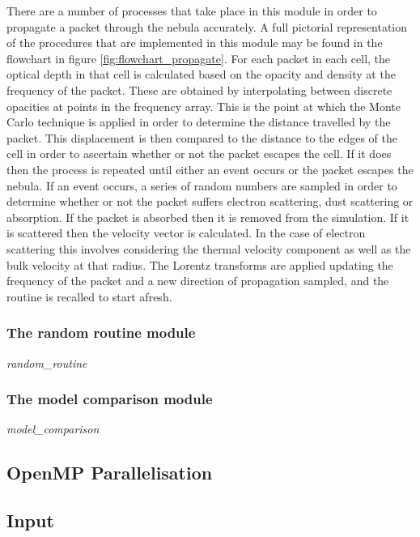 		There are a number of processes that take place in this module in order to propagate a packet through the nebula accurately.  A full pictorial representation of the procedures that are implemented in this module may be found in the flowchart in figure \ref{fig:flowchart_propagate}. For each packet in each cell, the optical depth in that cell is calculated based on the opacity and density at the frequency of the packet.  These are obtained by interpolating between discrete opacities at points in the frequency array.  This is the point at which the Monte Carlo technique is applied in order to determine the distance travelled by the packet.  This displacement is then compared to the distance to the edges of the cell in order to ascertain whether or not the packet escapes the cell.  If it does then the process is repeated until either an event occurs or the packet escapes the nebula.  If an event occurs, a series of random numbers are sampled in order to determine whether or not the packet suffers electron scattering, dust scattering or absorption.  If the packet is absorbed then it is removed from the simulation.  If it is scattered then the velocity vector is calculated.  In the case of electron scattering this involves considering the thermal velocity component as well as the bulk velocity at that radius.  The Lorentz transforms are applied updating the frequency of the packet and a new direction of propagation sampled, and the routine is recalled to start afresh. 
	

		
		\subsubsection{The random routine module}
		\textit{random\_routine}
		
		\subsubsection{The model comparison module}
		\textit{model\_comparison}
	
	\subsection{OpenMP Parallelisation}	
	\label{scn:open_mp}
	
	\subsection{Input}
	
